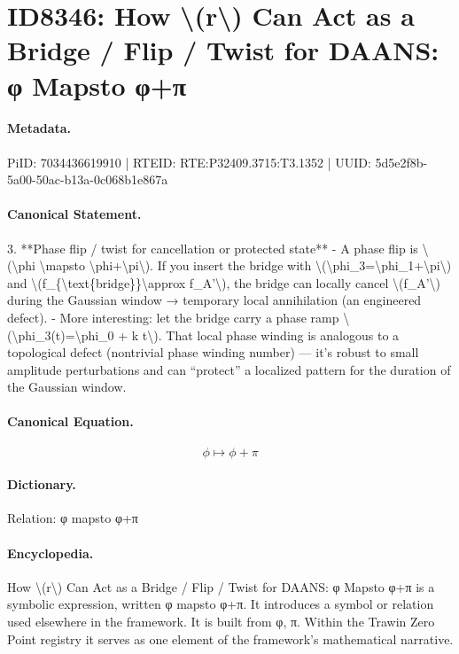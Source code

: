 \section*{ID8346: How \textbackslash{}(r\textbackslash{}) Can Act as a Bridge / Flip / Twist for DAANS: φ Mapsto φ+π}
\paragraph{Metadata.}
PiID: 7034436619910 | RTEID: RTE:P32409.3715:T3.1352 | UUID: 5d5e2f8b-5a00-50ac-b13a-0c068b1e867a

\paragraph{Canonical Statement.}
3. **Phase flip / twist for cancellation or protected state** - A phase flip is \textbackslash{}(\textbackslash{}phi \textbackslash{}mapsto \textbackslash{}phi+\textbackslash{}pi\textbackslash{}). If you insert the bridge with \textbackslash{}(\textbackslash{}phi\_3=\textbackslash{}phi\_1+\textbackslash{}pi\textbackslash{}) and \textbackslash{}(f\_\{\textbackslash{}text\{bridge\}\}\textbackslash{}approx f\_A'\textbackslash{}), the bridge can locally cancel \textbackslash{}(f\_A'\textbackslash{}) during the Gaussian window → temporary local annihilation (an engineered defect). - More interesting: let the bridge carry a phase ramp \textbackslash{}(\textbackslash{}phi\_3(t)=\textbackslash{}phi\_0 + k t\textbackslash{}). That local phase winding is analogous to a topological defect (nontrivial phase winding number) — it’s robust to small amplitude perturbations and can “protect” a localized pattern for the duration of the Gaussian window.

\paragraph{Canonical Equation.}
\[
\phi \mapsto \phi+\pi
\]

\paragraph{Dictionary.}
Relation: φ mapsto φ+π

\paragraph{Encyclopedia.}
How \textbackslash{}(r\textbackslash{}) Can Act as a Bridge / Flip / Twist for DAANS: φ Mapsto φ+π is a symbolic expression, written φ mapsto φ+π. It introduces a symbol or relation used elsewhere in the framework. It is built from φ, π. Within the Trawin Zero Point registry it serves as one element of the framework's mathematical narrative.
